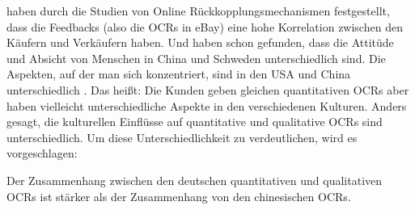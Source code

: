 \citeauthor{resnick2002trust} haben durch die Studien von Online Rückkopplungsmechanismen festgestellt, dass die Feedbacks (also die \ac{OCRs} in eBay) eine hohe Korrelation zwischen den Käufern und Verkäufern haben. Und \citeauthor{Stenberg2014} haben schon gefunden, dass die Attitüde und Absicht von Menschen in China und Schweden unterschiedlich sind. Die Aspekten, auf der man sich konzentriert, sind in den USA und China unterschiedlich \citep{lu2015understanding}. Das heißt: Die Kunden geben gleichen quantitativen \ac{OCRs} aber haben vielleicht unterschiedliche Aspekte in den verschiedenen Kulturen. Anders gesagt, die kulturellen Einflüsse auf quantitative und qualitative \ac{OCRs} sind unterschiedlich. Um diese Unterschiedlichkeit zu verdeutlichen, wird es vorgeschlagen:
\begin{hyp} 
Der Zusammenhang zwischen den deutschen quantitativen und qualitativen \acl{OCRs} ist stärker als der Zusammenhang von den chinesischen \acl{OCRs}.
\label{hyp:4}
\end{hyp}
